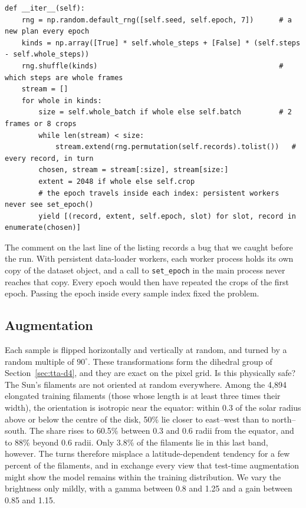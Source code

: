 \begin{lstlisting}[caption={Planning optimiser steps of crops or whole frames. Condensed from
\file{experiments/exp\_139\_mask2former/src/data.py:ExtentBatchSampler}.},label=lst:train-sampler]
def __iter__(self):
    rng = np.random.default_rng([self.seed, self.epoch, 7])      # a new plan every epoch
    kinds = np.array([True] * self.whole_steps + [False] * (self.steps - self.whole_steps))
    rng.shuffle(kinds)                                           # which steps are whole frames
    stream = []
    for whole in kinds:
        size = self.whole_batch if whole else self.batch         # 2 frames or 8 crops
        while len(stream) < size:
            stream.extend(rng.permutation(self.records).tolist())   # every record, in turn
        chosen, stream = stream[:size], stream[size:]
        extent = 2048 if whole else self.crop
        # the epoch travels inside each index: persistent workers never see set_epoch()
        yield [(record, extent, self.epoch, slot) for slot, record in enumerate(chosen)]
\end{lstlisting}

The comment on the last line of the listing records a bug that we caught before the run. With
persistent data-loader workers, each worker process holds its own copy of the dataset object, and a
call to \texttt{set\_epoch} in the main process never reaches that copy. Every epoch would then have
repeated the crops of the first epoch. Passing the epoch inside every sample index fixed the problem.

\subsection{Augmentation}\label{sec:train-augmentation}
Each sample is flipped horizontally and vertically at random, and turned by a random multiple of
$90^\circ$. These transformations form the dihedral group of Section~\ref{sec:tta-d4}, and they are
exact on the pixel grid. Is this physically safe? The Sun's filaments are not oriented at random
everywhere. Among the 4,894 elongated training filaments (those whose length is at least three times
their width), the orientation is isotropic near the equator: within 0.3 of the solar radius above or
below the centre of the disk, 50\% lie closer to east--west than to north--south. The share rises to
60.5\% between 0.3 and 0.6 radii from the equator, and to 88\% beyond 0.6 radii. Only 3.8\% of the filaments lie in this last band,
however. The turns therefore misplace a latitude-dependent tendency for a few percent of the
filaments, and in exchange every view that test-time augmentation might show the model remains within
the training distribution. We vary the brightness only mildly, with a gamma between 0.8 and 1.25 and a
gain between 0.85 and 1.15.

